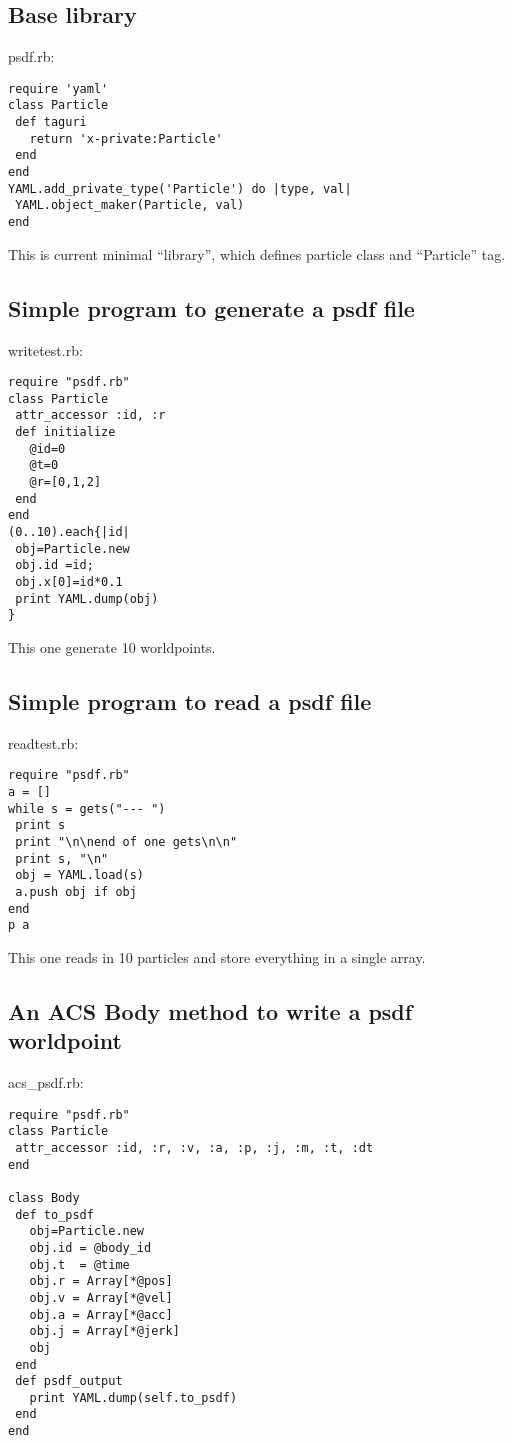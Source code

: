 \documentclass[12pt]{article}
\begin{document}
\subsection{Base library}
psdf.rb:
\begin{verbatim}
require 'yaml'
class Particle
 def taguri
   return 'x-private:Particle'
 end
end
YAML.add_private_type('Particle') do |type, val|
 YAML.object_maker(Particle, val)
end
\end{verbatim}

This is current minimal ``library'', which defines particle class and
``Particle'' tag.

\subsection{Simple program to generate a psdf file}

writetest.rb:
\begin{verbatim}
require "psdf.rb"
class Particle
 attr_accessor :id, :r   
 def initialize
   @id=0
   @t=0
   @r=[0,1,2]
 end
end
(0..10).each{|id|
 obj=Particle.new
 obj.id =id;
 obj.x[0]=id*0.1
 print YAML.dump(obj)
}
\end{verbatim}

This one generate 10 worldpoints.

\subsection{Simple program to read a psdf file}

readtest.rb:
\begin{verbatim}
require "psdf.rb"
a = []
while s = gets("--- ")
 print s
 print "\n\nend of one gets\n\n"
 print s, "\n"
 obj = YAML.load(s) 
 a.push obj if obj
end
p a
\end{verbatim}

This one reads in 10 particles and store everything in a single array.

\subsection{An ACS Body method to write a psdf worldpoint}

acs\_psdf.rb:
\begin{verbatim}
require "psdf.rb"
class Particle
 attr_accessor :id, :r, :v, :a, :p, :j, :m, :t, :dt
end

class Body
 def to_psdf
   obj=Particle.new
   obj.id = @body_id
   obj.t  = @time
   obj.r = Array[*@pos]
   obj.v = Array[*@vel]
   obj.a = Array[*@acc]
   obj.j = Array[*@jerk]
   obj
 end
 def psdf_output
   print YAML.dump(self.to_psdf)
 end
end
\end{verbatim}
\end{document}
